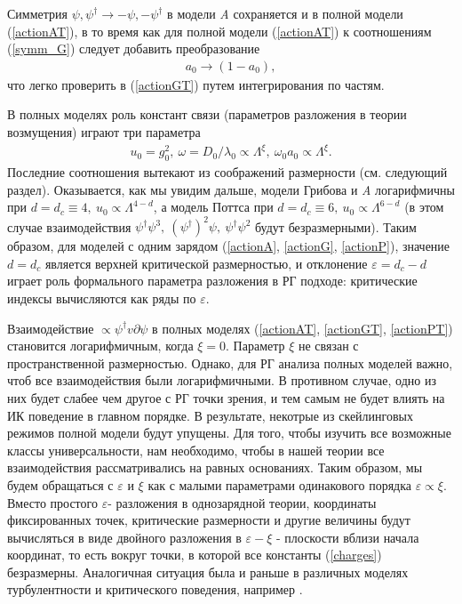 \documentclass []{rusthesis} %
\begin{document}
Симметрия $\psi, \psi^{\dag} \rightarrow -\psi, -\psi^{\dag}$ в модели {\it A} сохраняется и в
полной модели (\ref{actionAT}), в то время как для полной модели (\ref{actionAT}) к соотношениям (\ref{symm_G}) следует добавить преобразование
\begin{eqnarray}
a_0 \rightarrow (1-a_0),
\label{symm_G_add}
\end{eqnarray}
что легко проверить в (\ref{actionGT}) путем интегрирования по частям.

В полных моделях роль констант связи (параметров разложения в теории возмущения) играют три параметра
\begin{eqnarray}
u_0=g_0^2,\ \omega=D_0/\lambda_0 \propto \Lambda^{\xi},\ \omega_0 a_0 \propto \Lambda^{\xi}.
\label{charges}
\end{eqnarray}
Последние соотношения вытекают из соображений размерности (см. следующий раздел). Оказывается, как мы увидим дальше, модели Грибова и {\it A} логарифмичны при $d=d_c\equiv 4,\ u_0\propto \Lambda^{4-d}$, а модель Поттса при $d=d_c\equiv 6,\ u_0\propto \Lambda^{6-d}$ (в этом случае взаимодействия $\psi^{\dag}\psi^3,\ (\psi^{\dag})^2\psi,\ \psi^{\dag}\psi^2$ будут безразмерными). 
Таким образом, для моделей с одним зарядом (\ref{actionA}, \ref{actionG}, \ref{actionP}), значение $d=d_c$ является верхней критической размерностью, и отклонение $\varepsilon=d_c-d$ играет роль формального параметра разложения в РГ подходе: критические индексы вычисляются как ряды по $\varepsilon$.

Взаимодействие $\propto \psi^{\dag}v\partial \psi$ в полных моделях (\ref{actionAT}, \ref{actionGT}, \ref{actionPT}) становится логарифмичным, когда $\xi=0$. Параметр $\xi$ не связан с пространственной размерностью. Однако, для РГ анализа полных моделей важно, чтоб все взаимодействия были логарифмичными. В противном случае, одно из них будет слабее чем другое с РГ точки зрения, и тем самым не будет влиять на ИК поведение в главном порядке.
В результате, некотрые из скейлинговых режимов полной модели будут упущены.
Для того, чтобы изучить все возможные классы универсальности, нам необходимо, чтобы в нашей теории все взаимодействия рассматривались на равных основаниях.
Таким образом, мы будем обращаться с $\varepsilon$ и $\xi$ как с малыми параметрами одинакового порядка $\varepsilon \propto \xi$. 
Вместо простого $\varepsilon$- разложения в однозарядной теории, координаты фиксированных точек, критические размерности и другие величины будут вычисляться в виде двойного разложения в $\varepsilon-\xi$ - плоскости вблизи начала координат, то есть вокруг точки, в которой все константы (\ref{charges}) безразмерны. Аналогичная ситуация была и раньше в различных моделях турбулентности и критического поведения, например \cite{AHH, Alexa, AIK, AIM, Sak}.
\end{document}
